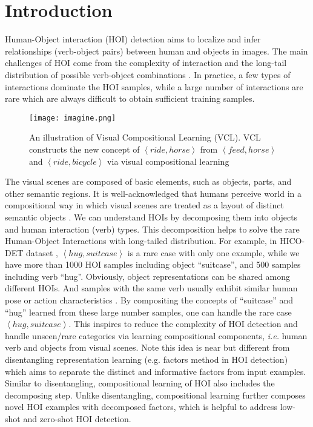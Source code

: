 \documentclass[runningheads]{llncs}
\newcommand{\ie}{\textit{i.e. }}
\begin{document}
\section{Introduction}
Human-Object interaction (HOI) detection \cite{chao2018learning, gao2018ican, li2018transferable, qi2018learning} aims to localize and infer relationships (verb-object pairs) between human and objects in images.
The main challenges of HOI come from the complexity of interaction and the long-tail distribution of possible verb-object combinations \cite{chao2018learning, shen2018scaling, xu2019learning}.
In practice, a few types of interactions dominate the HOI samples,
while a large number of interactions are rare which are always difficult to obtain sufficient training samples.

\begin{figure}[t]
\begin{center}
\texttt{[image: imagine.png]}
\end{center}
   \caption{An illustration of Visual Compositional Learning (VCL). VCL constructs the new concept of $\left \langle ride, horse\right \rangle$ from $\left\langle feed, horse\right \rangle$ and $\left \langle ride, bicycle\right\rangle$ via visual compositional learning}
\label{fig:imagine}
\end{figure}

The visual scenes are composed of basic elements, such as objects, parts, and other semantic regions.
It is well-acknowledged that humans perceive world in a compositional way in which visual scenes are treated as a layout of distinct semantic objects \cite{spelke1990principles, hoffman1983parts}. We can understand HOIs by decomposing them into objects and human interaction (verb) types. This decomposition helps to solve the rare Human-Object Interactions with long-tailed distribution. For example, in HICO-DET dataset \cite{chao2018learning}, $\left \langle hug, suitcase \right \rangle$ is a rare case with only one example, while we have more than 1000 HOI samples including object ``suitcase'', and 500 samples including verb ``hug''. Obviously, object representations can be shared among different HOIs. And samples with the same verb usually exhibit similar human pose or action characteristics \cite{xu2019learning}. By compositing the concepts of ``suitcase'' and ``hug'' learned from these large number samples, one can handle the rare case $\left \langle hug, suitcase \right \rangle$. This inspires to reduce the complexity of HOI detection and handle unseen/rare categories via learning compositional components, \ie human verb and objects from visual scenes. Note this idea is near but different from disentangling representation learning \cite{bengio2013representation} (e.g. factors method \cite{shen2018scaling} in HOI detection) which aims to separate the distinct and informative factors from input examples. Similar to disentangling, compositional learning of HOI also includes the decomposing step. Unlike disentangling, compositional learning further composes novel HOI examples with decomposed factors, which is helpful to address low-shot and zero-shot HOI detection.
\end{document}
